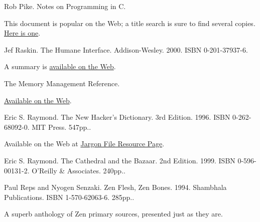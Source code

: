 \documentclass[12pt,oneside]{book}
\begin{document}
\begin{common-format}
\begin{thebibliography}{9}
%
%
%
%
%
%
%
%
%
 Rob Pike. Notes on Programming in C.

This document is popular on the Web; a title search is sure to find several copies. \href{http://www.lysator.liu.se/c/pikestyle.html}{Here is one}.

%
 Jef Raskin. The Humane Interface. Addison-Wesley. 2000. ISBN 0-201-37937-6.

A summary is \href{http://humane.sourceforge.net/humane_interface/summary_of_thi.html}{available on the Web}.

 The Memory Management Reference.

\href{http://www.memorymanagement.org/}{Available on the Web}.

 Eric S. Raymond. The New Hacker's Dictionary. 3rd Edition. 1996. ISBN 0-262-68092-0. MIT Press. 547pp..

Available on the Web at \href{http://www.catb.org/~esr/jargon}{Jargon File Resource Page}.

 Eric S. Raymond. The Cathedral and the Bazaar. 2nd Edition. 1999. ISBN 0-596-00131-2. O'Reilly \&{} Associates. 240pp..

 Paul Reps and Nyogen Senzaki. Zen Flesh, Zen Bones. 1994. Shambhala Publications. ISBN 1-570-62063-6. 285pp..

A superb anthology of Zen primary sources, presented just as they are.


\end{thebibliography}
\end{common-format}
\end{document}
